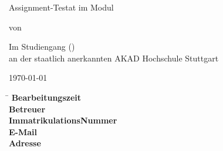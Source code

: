 \begin{titlepage}
\begin{center}
\thispagestyle{empty}

\Large{\textbf{\Title}}
\vspace{1cm}
\onehalfspacing

\large{Assignment-Testat im Modul \Module}

\vspace{1cm}
\normalsize

von

\vspace{.5cm} 
\large{\Name}
\normalsize
\vspace{1cm}

Im Studiengang \CourseOfStudy (\DegreeAbbr)\\
an der staatlich anerkannten AKAD Hochschule Stuttgart
\vspace{2cm}

\today



\end{center}

\vfill
\begin{spacing}{1.2}
    \begin{tabbing}
	    \hspace{9cm}     \= \kill
	    \textbf{Bearbeitungszeit}  \>  \ProcessingTime \\
	    \textbf{Betreuer}              \>  \Supervisor \\
	    \textbf{ImmatrikulationsNummer}  \>  \RegistrationNumber \\
	    \textbf{E-Mail}		\> \href{mailto:\Email}{\Email} \\
	    \textbf{Adresse}		\> \Address \\
	    		\> \City
	\end{tabbing}
\end{spacing}
\restoregeometry
\end{titlepage}